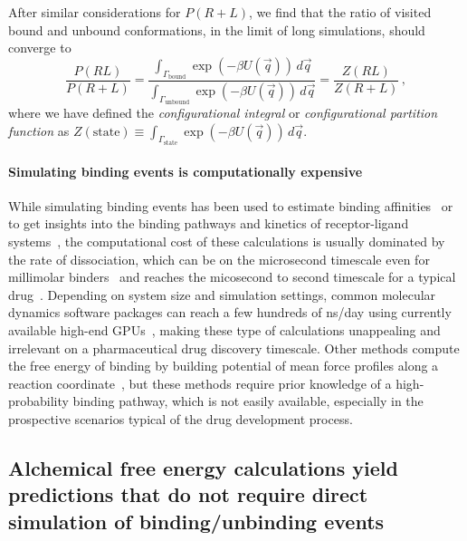 \documentclass[9pt,bestpractices]{livecoms}
\begin{document}
After similar considerations for $P(R+L)$, we find that the ratio of visited bound and unbound conformations, in the limit of long simulations, should converge to
\begin{equation}\label{eq:bound-unbound-probability-ratio}
    \frac{P(RL)}{P(R+L)} = \frac{\int_{\Gamma_{\mathrm{bound}}} \exp\left( -\beta U(\vec{q}) \right) \, d\vec{q}}{\int_{\Gamma_{\mathrm{unbound}}} \exp\left( -\beta U(\vec{q}) \right) \, d\vec{q}} = \frac{Z(RL)}{Z(R+L)} \, ,
\end{equation}
where we have defined the \textit{configurational integral} or \textit{configurational partition function} as $Z(\mathrm{state}) \equiv \int_{\Gamma_{\mathrm{state}}} \exp\left(-\beta U(\vec{q})\right) \, d\vec{q}$.

\paragraph{Simulating binding events is computationally expensive}
While simulating binding events has been used to estimate binding affinities~\cite{jong2011determining,pan2017quantitative} or to get insights into the binding pathways and kinetics of receptor-ligand systems~\cite{teo2016adaptive,votapka2017seekr,doerr2014onthefly,plattner2015protein,dixon2018predicting}, the computational cost of these calculations is usually dominated by the rate of dissociation, which can be on the microsecond timescale even for millimolar binders~\cite{pan2017quantitative} and reaches the micosecond to second timescale for a typical drug~\cite{basavapathruni2012conformational,hyre2006cooperative}.
Depending on system size and simulation settings, common molecular dynamics software packages can reach a few hundreds of ns/day using currently available high-end GPUs~\cite{eastman2017openmm,kutzner2019more}, making these type of calculations unappealing and irrelevant on a pharmaceutical drug discovery timescale.
Other methods compute the free energy of binding by building potential of mean force profiles along a reaction coordinate~\cite{woo2005calculationa,velez-vega2013overcoming,limongelli2013funnel,heinzelmann2017attachpullrelease}, but these methods require prior knowledge of a high-probability binding pathway, which is not easily available, especially in the prospective scenarios typical of the drug development process.

\subsection{Alchemical free energy calculations yield predictions that do not require direct simulation of binding/unbinding events}
\end{document}

